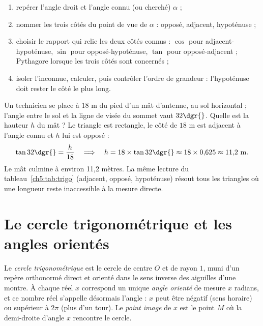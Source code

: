\begin{methode}
\begin{enumerate}
  \item repérer l'angle droit et l'angle connu (ou cherché) $\alpha$ ;
  \item nommer les trois côtés du point de vue de $\alpha$ : opposé, adjacent, hypoténuse ;
  \item choisir le rapport qui relie les deux côtés connus : $\cos$ pour adjacent-hypoténuse, $\sin$ pour opposé-hypoténuse, $\tan$ pour opposé-adjacent ; Pythagore lorsque les trois côtés sont concernés ;
  \item isoler l'inconnue, calculer, puis contrôler l'ordre de grandeur : l'hypoténuse doit rester le côté le plus long.
\end{enumerate}
\end{methode}

\begin{exemple}
Un technicien se place à $18$ m du pied d'un mât d'antenne, au sol horizontal ; l'angle entre le sol et la ligne de visée du sommet vaut $32\dgr{}$. Quelle est la hauteur $h$ du mât ? Le triangle est rectangle, le côté de $18$ m est adjacent à l'angle connu et $h$ lui est opposé :
\[
\tan 32\dgr{} = \frac{h}{18}
\quad\Longrightarrow\quad
h = 18 \times \tan 32\dgr{} \approx 18 \times 0{,}625 \approx 11{,}2\ \text{m} .
\]
Le mât culmine à environ 11,2 mètres. La même lecture du tableau~\ref{ch5:tab:trigo} (adjacent, opposé, hypoténuse) résout tous les triangles où une longueur reste inaccessible à la mesure directe.
\end{exemple}

\section{Le cercle trigonométrique et les angles orientés}

\begin{definition}
Le \emph{cercle trigonométrique} est le cercle de centre $O$ et de rayon $1$, muni d'un repère orthonormé direct et orienté dans le sens inverse des aiguilles d'une montre. À chaque réel $x$ correspond un unique \emph{angle orienté} de mesure $x$ radians, et ce nombre réel s'appelle désormais l'angle : $x$ peut être négatif (sens horaire) ou supérieur à $2\pi$ (plus d'un tour). Le \emph{point image} de $x$ est le point $M$ où la demi-droite d'angle $x$ rencontre le cercle.
\end{definition}

